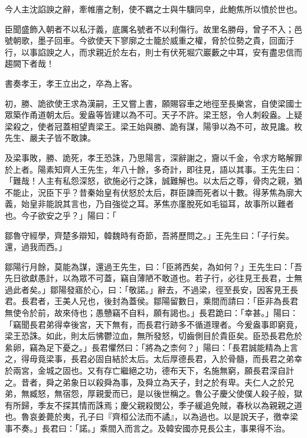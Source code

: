 \begin{pinyinscope}
今人主沈諂諛之辭，牽帷廧之制，使不羈之士與牛驥同皁，此鮑焦所以憤於世也。

臣聞盛飾入朝者不以私汙義，底厲名號者不以利傷行。故里名勝母，曾子不入；邑號朝歌，墨子回車。今欲使天下寥廓之士籠於威重之權，脅於位勢之貴，回面汙行，以事諂諛之人，而求親近於左右，則士有伏死堀穴巖藪之中耳，安有盡忠信而趨闕下者哉！

書奏孝王，孝王立出之，卒為上客。

初，勝、詭欲使王求為漢嗣，王又嘗上書，願賜容車之地徑至長樂宮，自使梁國士眾築作甬道朝太后。爰盎等皆建以為不可。天子不許。梁王怒，令人刺殺盎。上疑梁殺之，使者冠蓋相望責梁王。梁王始與勝、詭有謀，陽爭以為不可，故見讒。枚先生、嚴夫子皆不敢諫。

及梁事敗，勝、詭死，孝王恐誅，乃思陽言，深辭謝之，齎以千金，令求方略解罪於上者。陽素知齊人王先生，年八十餘，多奇計，即往見，語以其事。王先生曰：「難哉！人主有私怨深怒，欲施必行之誅，誠難解也。以太后之尊，骨肉之親，猶不能止，況臣下乎？昔秦始皇有伏怒於太后，群臣諫而死者以十數。得茅焦為廓大義，始皇非能說其言也，乃自強從之耳。茅焦亦廑脫死如毛镒耳，故事所以難者也。今子欲安之乎？」陽曰：「

鄒魯守經學，齊楚多辯知，韓魏時有奇節，吾將歷問之。」王先生曰：「子行矣。還，過我而西。」

鄒陽行月餘，莫能為謀，還過王先生，曰：「臣將西矣，為如何？」王先生曰：「吾先日欲獻愚計，以為眾不可蓋，竊自薄陋不敢道也。若子行，必往見王長君，士無過此者矣。」鄒陽發寤於心，曰：「敬諾。」辭去，不過梁，徑至長安，因客見王長君。長君者，王美人兄也，後封為蓋侯。鄒陽留數日，乘間而請曰：「臣非為長君無使令於前，故來侍也；愚戇竊不自料，願有謁也。」長君跪曰：「幸甚。」陽曰：「竊聞長君弟得幸後宮，天下無有，而長君行跡多不循道理者。今爰盎事即窮竟，梁王恐誅。如此，則太后怫鬱泣血，無所發怒，切齒側目於貴臣矣。臣恐長君危於絫卵，竊為足下憂之。」長君懼然曰：「將為之柰何？」陽曰：「長君誠能精為上言之，得毋竟梁事，長君必固自結於太后。太后厚德長君，入於骨髓，而長君之弟幸於兩宮，金城之固也。又有存亡繼絕之功，德布天下，名施無窮，願長君深自計之。昔者，舜之弟象日以殺舜為事，及舜立為天子，封之於有卑。夫仁人之於兄弟，無臧怒，無宿怨，厚親愛而已，是以後世稱之。魯公子慶父使僕人殺子般，獄有所歸，季友不探其情而誅焉；慶父親殺閔公，季子緩追免賊，春秋以為親親之道也。魯哀姜薨於夷，孔子曰『齊桓公法而不譎』，以為過也。以是說天子，徼幸梁事不奏。」長君曰：「諾。」乘間入而言之。及韓安國亦見長公主，事果得不治。


\end{pinyinscope}

